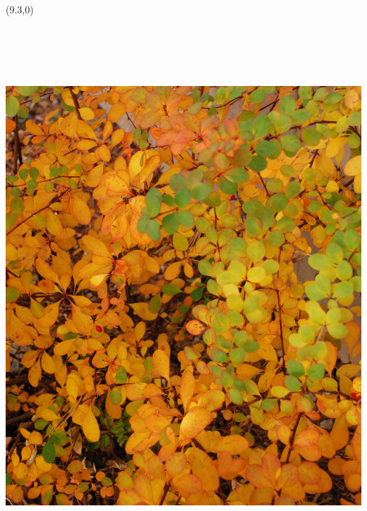 \documentclass{article}
\begin{document}
\begin{textblock}{6.125}(9.3,0)
\noindent\includegraphics[angle=90,height=8.25in,width=9.881in]{../../CoverImages/FrontMain.jpg}
\end{textblock}
\end{document}
